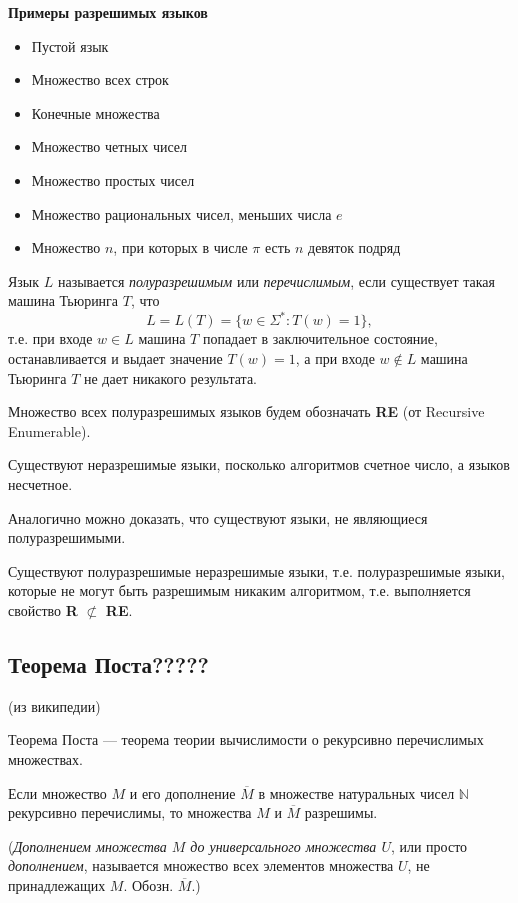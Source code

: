 \textbf{Примеры разрешимых языков}
\begin{itemize}
    \item Пустой язык
    \item Множество всех строк
    \item Конечные множества
    \item Множество четных чисел
    \item Множество простых чисел
    \item Множество рациональных чисел, меньших числа $e$
    \item Множество $n$, при которых в числе $\pi$ есть $n$ девяток подряд
\end{itemize}

\begin{definition}
    Язык $L$ называется \textit{полуразрешимым} или \textit{перечислимым}, если существует такая машина Тьюринга $T$, что
    $$L=L(T) = \{w\in \Sigma^*:T(w)=1\},$$
    т.е. при входе $w\in L$ машина $T$ попадает в заключительное состояние, останавливается и выдает значение $T(w) = 1$, а при входе $w\notin L$ машина Тьюринга $T$ не дает никакого результата.
\end{definition}

Множество всех полуразрешимых языков будем обозначать \textbf{RE} (от Recursive Enumerable).

\begin{lemma}
    Существуют неразрешимые языки, посколько алгоритмов счетное число, а языков несчетное.

    Аналогично можно доказать, что существуют языки, не являющиеся полуразрешимыми.
\end{lemma}

\begin{theorem}
    Существуют полуразрешимые неразрешимые языки, т.е. полуразрешимые языки, которые не могут быть разрешимым никаким алгоритмом, т.е. выполняется свойство \textbf{R} $\not\subset$ \textbf{RE}.
\end{theorem}

\subsection*{Теорема Поста?????}
(из википедии)

Теорема Поста — теорема теории вычислимости о рекурсивно перечислимых множествах. 

Если множество $M$ и его дополнение $\overline{M}$ в множестве натуральных чисел $\mathbb{N} $ рекурсивно перечислимы, то множества $M$ и $\overline{M}$ разрешимы.

(\textit{Дополнением множества $M$ до универсального множества $U$}, или просто \textit{дополнением}, называется множество всех элементов множества $U$, не принадлежащих $M$. Обозн. $\overline{M}.$)